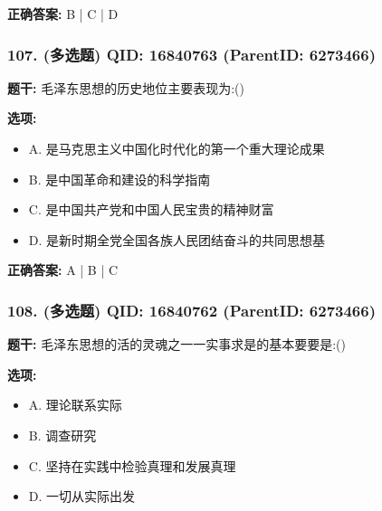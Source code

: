 \documentclass[12pt,UTF8]{ctexart}
\begin{document}
\textbf{正确答案:}
B | C | D

\vspace{0.3em}\hrulefill\vspace{0.7em}

\subsubsection*{107. (多选题) \small QID: 16840763 (ParentID: 6273466)}

\textbf{题干:}
毛泽东思想的历史地位主要表现为:()



\textbf{选项:}
\begin{itemize}[leftmargin=*]

  \item A. 是马克思主义中国化时代化的第一个重大理论成果

  \item B. 是中国革命和建设的科学指南

  \item C. 是中国共产党和中国人民宝贵的精神财富

  \item D. 是新时期全党全国各族人民团结奋斗的共同思想基

\end{itemize}

\textbf{正确答案:}
A | B | C

\vspace{0.3em}\hrulefill\vspace{0.7em}

\subsubsection*{108. (多选题) \small QID: 16840762 (ParentID: 6273466)}

\textbf{题干:}
毛泽东思想的活的灵魂之一一实事求是的基本要要是:()



\textbf{选项:}
\begin{itemize}[leftmargin=*]

  \item A. 理论联系实际

  \item B. 调查研究

  \item C. 坚持在实践中检验真理和发展真理

  \item D. 一切从实际出发

\end{itemize}
\end{document}
